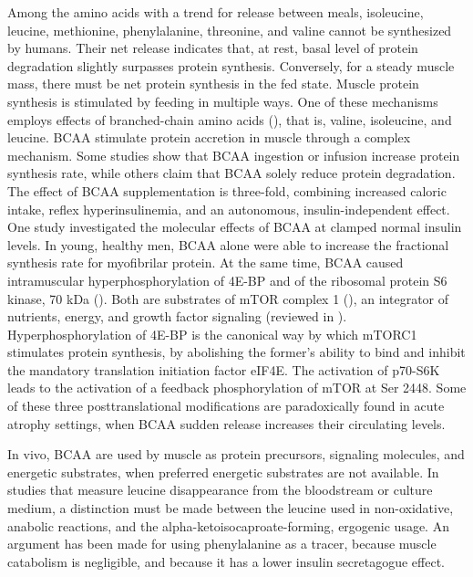 \documentclass[12pt,english]{report}\usepackage[]{graphicx}\usepackage[]{color}
\begin{document}
Among the amino acids with a trend for release between meals, isoleucine,
leucine, methionine, phenylalanine, threonine, and valine cannot be
synthesized by humans. Their net release indicates that, at rest,
basal level of protein degradation slightly surpasses protein synthesis.
Conversely, for a steady muscle mass, there must be net protein synthesis
in the fed state. Muscle protein synthesis is stimulated by feeding
in multiple ways. One of these mechanisms employs effects of branched-chain
amino acids (), that
is, valine, isoleucine, and leucine. BCAA stimulate protein accretion
in muscle through a complex mechanism. Some studies show that BCAA
ingestion or infusion increase protein synthesis rate\citep{bennet1989increase},
while others claim that BCAA solely reduce protein degradation\citep{nair1992leucine}.
The effect of BCAA supplementation is three-fold, combining increased
caloric intake, reflex hyperinsulinemia, and an autonomous, insulin-independent
effect. One study investigated the molecular effects of BCAA at clamped
normal insulin levels\citep{cuthbertson2005anabolic}. In young, healthy
men, BCAA alone were able to increase the fractional synthesis rate
for myofibrilar protein. At the same time, BCAA caused intramuscular
hyperphosphorylation of 4E-BP and of the ribosomal protein S6 kinase,
70 kDa ().
Both are substrates of mTOR complex 1 (),
an integrator of nutrients, energy, and growth factor signaling (reviewed
in \citep{laplante2012mtor}). Hyperphosphorylation of 4E-BP is the
canonical way by which mTORC1 stimulates protein synthesis, by abolishing
the former's ability to bind and inhibit the mandatory translation
initiation factor eIF4E. The activation of p70-S6K leads to the activation
of a feedback phosphorylation of mTOR at Ser 2448\citep{chiang2005phosphorylation}.
Some of these three posttranslational modifications are paradoxically
found in acute atrophy settings, when BCAA sudden release increases
their circulating levels.

In vivo, BCAA are used by muscle as protein precursors, signaling
molecules, and energetic substrates, when preferred energetic substrates
are not available\citep{suryawan1998molecular}. In studies that measure
leucine disappearance from the bloodstream or culture medium, a distinction
must be made between the leucine used in non-oxidative, anabolic reactions,
and the alpha-ketoisocaproate-forming, ergogenic usage. An argument
has been made for using phenylalanine as a tracer, because muscle
catabolism is negligible, and because it has a lower insulin secretagogue
effect\citep{garlick1980rapid,cynober2003metabolic}.
\end{document}
